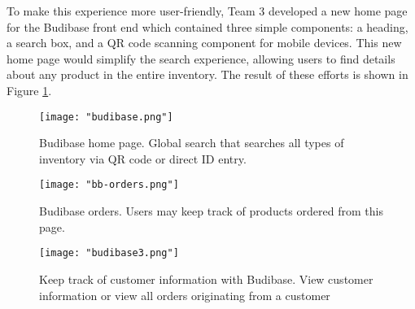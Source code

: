 \documentclass{article}
\begin{document}
To make this experience more user-friendly, Team 3 developed a new 
home page for the Budibase front end which contained three simple components: a heading, a search box, and a QR code scanning component
for mobile devices. This new home page would simplify the search experience, allowing users to find details about any product in the 
entire inventory. The result of these efforts is shown in Figure \ref{fig:budibase_home}.

 \begin{figure}[h!]
    \centering
    \texttt{[image: "budibase.png"]}
    \caption{Budibase home page. Global search that searches all types of inventory via QR code or direct ID entry.}
    \label{fig:budibase_home}
\end{figure}
\begin{figure}[h!]
    \centering
    \texttt{[image: "bb-orders.png"]}
    \caption{Budibase orders. Users may keep track of products ordered from this page.}
    \label{fig:bb-orders}
\end{figure}
\begin{figure}[h!]
    \centering
    \texttt{[image: "budibase3.png"]}
    \caption{Keep track of customer information with Budibase. View customer information or view all orders originating from a
    customer}
    \label{fig:budibase_customers}
\end{figure}

\FloatBarrier
\end{document}
